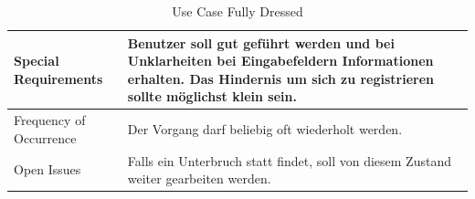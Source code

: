 \begin{table}
\begin{tabular}{ | p{3cm} | p{9cm}  | }
	Special Requirements & Benutzer soll gut geführt werden und bei Unklarheiten bei
Eingabefeldern Informationen erhalten.
Das Hindernis um sich zu registrieren sollte möglichst klein sein. \\ \hline
	Frequency of Occurrence & Der Vorgang darf beliebig oft wiederholt werden. \\ \hline
	Open Issues & Falls ein Unterbruch statt findet, soll von diesem Zustand weiter gearbeiten werden. \\ \hline
    \end{tabular}
    \caption[Use Case Fully Dressed]{Use Case Fully Dressed}
\end{table}


